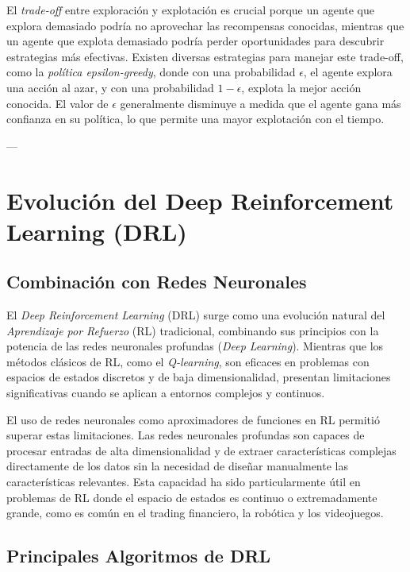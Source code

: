\documentclass[a4paper,12pt]{report}
\begin{document}
El \textit{trade-off} entre exploración y explotación es crucial porque un agente que explora demasiado podría no aprovechar las recompensas conocidas, mientras que un agente que explota demasiado podría perder oportunidades para descubrir estrategias más efectivas. Existen diversas estrategias para manejar este trade-off, como la \textit{política epsilon-greedy}, donde con una probabilidad \(\epsilon\), el agente explora una acción al azar, y con una probabilidad \(1-\epsilon\), explota la mejor acción conocida. El valor de \(\epsilon\) generalmente disminuye a medida que el agente gana más confianza en su política, lo que permite una mayor explotación con el tiempo.

---


\section{Evolución del Deep Reinforcement Learning (DRL)}

\subsection{Combinación con Redes Neuronales}

El \textit{Deep Reinforcement Learning} (DRL) surge como una evolución natural del \textit{Aprendizaje por Refuerzo} (RL) tradicional, combinando sus principios con la potencia de las redes neuronales profundas (\textit{Deep Learning}). Mientras que los métodos clásicos de RL, como el \textit{Q-learning}, son eficaces en problemas con espacios de estados discretos y de baja dimensionalidad, presentan limitaciones significativas cuando se aplican a entornos complejos y continuos. 

El uso de redes neuronales como aproximadores de funciones en RL permitió superar estas limitaciones. Las redes neuronales profundas son capaces de procesar entradas de alta dimensionalidad y de extraer características complejas directamente de los datos sin la necesidad de diseñar manualmente las características relevantes. Esta capacidad ha sido particularmente útil en problemas de RL donde el espacio de estados es continuo o extremadamente grande, como es común en el trading financiero, la robótica y los videojuegos.

\subsection{Principales Algoritmos de DRL}
\end{document}
